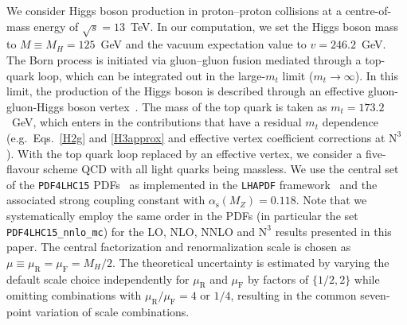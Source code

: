 \documentclass[12pt]{article}
\DeclareRobustCommand{\alphas}{\ensuremath{\alpha_{\mathrm{s}}}\xspace}
\DeclareRobustCommand{\as}{\alphas}
\DeclareRobustCommand{\mur}{\ensuremath{\mu_{\mathrm{R}}}\xspace}
\DeclareRobustCommand{\muR}{\mur}
\DeclareRobustCommand{\muf}{\ensuremath{\mu_{\mathrm{F}}}\xspace}
\DeclareRobustCommand{\muF}{\muf}
\DeclareRobustCommand{\LO}{\text{LO}\xspace}
\DeclareRobustCommand{\N}[1]{\ensuremath{\text{N}^{#1}}} %
\begin{document}
We consider Higgs boson production in proton--proton collisions at a centre-of-mass energy of $\sqrt{s}=13$~TeV. In our computation, we set the Higgs boson mass to $M\equiv M_H= 125$~GeV and the vacuum expectation value to $v=246.2$~GeV. 
The Born process is initiated via gluon--gluon fusion mediated through a top-quark loop, which can be integrated out in the large-$m_t$ limit ($m_{t}\rightarrow \infty$).
In this limit, the production of the Higgs boson is described through an effective gluon-gluon-Higgs boson vertex~\cite{Heft}.
The mass of the top quark is taken as $m_t = 173.2$~GeV, which enters in the contributions that have a residual $m_t$ dependence (e.g.\ Eqs.~\eqref{H2g} and \eqref{H3approx} and effective vertex coefficient corrections at \N3\LO). 
With the top quark loop replaced by an effective vertex, we consider a five-flavour scheme QCD with all light quarks being massless. We use the central set of the \verb|PDF4LHC15| PDFs~\cite{nnpdf} as implemented in the \texttt{LHAPDF} framework~\cite{Buckley:2014ana} and the associated strong coupling constant with $\as(M_Z)=0.118$. Note that we systematically employ the same order in the PDFs (in particular the set \verb|PDF4LHC15_nnlo_mc|) for the LO, NLO, NNLO and \N3\LO results presented in this paper. The central factorization and renormalization scale is chosen as $\mu \equiv \muR = \muF =  M_H / 2$. The theoretical uncertainty is estimated by varying the default scale choice independently for $\muR$ and $\muF$ by factors of $\{1/2,2\}$ while omitting combinations with $\muR/\muF = 4$ or $1/4$, resulting in the common seven-point variation of scale combinations. 
\end{document}
